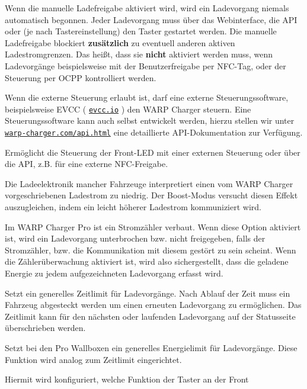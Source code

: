 \documentclass[a4paper,10pt]{article}
\newcommand\rurl[2]{%
  \href{#1}{\nolinkurl{#2}}%
}
\begin{document}
\begin{multicols*}{2}
    \begin{description}[labelindent=0.5cm, leftmargin=0.5cm]
     \item[Manuelle Ladefreigabe] Wenn die manuelle Ladefreigabe aktiviert wird, wird ein Ladevorgang niemals automatisch begonnen. Jeder Ladevorgang muss über das Webinterface, die API oder (je nach Tastereinstellung) den Taster gestartet werden. Die manuelle Ladefreigabe blockiert \textbf{zusätzlich} zu eventuell anderen aktiven Ladestromgrenzen. Das heißt, dass sie \textbf{nicht} aktiviert werden muss, wenn Ladevorgänge beispielsweise mit der Benutzerfreigabe per NFC-Tag, oder der Steuerung per OCPP kontrolliert werden.
     \item[Externe Steuerung] Wenn die externe Steuerung erlaubt ist, darf eine externe Steuerungssoftware, beispielsweise
     EVCC (\rurl{https://evcc.io}{evcc.io}) den WARP Charger steuern. Eine Steuerungssoftware kann auch selbst entwickelt werden, hierzu stellen
     wir unter \rurl{https://warp-charger.com/api.html}{warp-charger.com/api.html} eine detaillierte API-Dokumentation zur Verfügung.
     \item[Status-LED-Steuerung] Ermöglicht die Steuerung der Front-LED mit einer externen Steuerung oder über die API, z.B. für eine externe NFC-Freigabe.
     \item[Boost-Modus] Die Ladeelektronik mancher Fahrzeuge interpretiert einen vom WARP Charger vorgeschriebenen Ladestrom zu niedrig. Der Boost-Modus versucht diesen Effekt auszugleichen, indem ein leicht höherer Ladestrom kommuniziert wird.
     \item[Zählerüberwachung] Im WARP Charger Pro ist ein Stromzähler verbaut. Wenn diese Option aktiviert ist, wird ein Ladevorgang unterbrochen bzw. nicht freigegeben, falls der Stromzähler, bzw. die Kommunikation mit diesem gestört zu sein scheint. Wenn die Zählerüberwachung aktiviert ist, wird also sichergestellt, dass die geladene Energie zu jedem aufgezeichneten Ladevorgang erfasst wird.
     \item[Zeitlimit] Setzt ein generelles Zeitlimit für Ladevorgänge. Nach Ablauf der Zeit muss ein Fahrzeug abgesteckt werden um einen erneuten Ladevorgang zu ermöglichen. Das Zeitlimit kann für den nächsten oder laufenden Ladevorgang auf der Statusseite überschrieben werden.
     \item[Energielimit] Setzt bei den Pro Wallboxen ein generelles Energielimit für Ladevorgänge. Diese Funktion wird analog zum Zeitlimit eingerichtet.
     \item[Tastereinstellung] Hiermit wird konfiguriert, welche Funktion der Taster an der Front

\end{description}
\end{multicols*}
\end{document}

